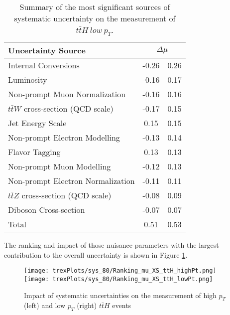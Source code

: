\begin{table}[H]
    \centering
    \begin{tabular}{l|cc}
        \hline\hline
        Uncertainty Source & \multicolumn{2}{c}{$\Delta \mu$ }  \\
        \hline
        Internal Conversions & -0.26 & 0.26 \\
        Luminosity & -0.16 & 0.17 \\
        Non-prompt Muon Normalization & -0.16 & 0.16 \\
        $t\bar{t}W$ cross-section (QCD scale) & -0.17 & 0.15 \\
        Jet Energy Scale & 0.15 & 0.15 \\
        Non-prompt Electron Modelling & -0.13 & 0.14 \\
        Flavor Tagging & 0.13 & 0.13 \\
        Non-prompt Muon Modelling & -0.12 & 0.13 \\
        Non-prompt Electron Normalization & -0.11 & 0.11 \\
        $t\bar{t}Z$ cross-section (QCD scale) & -0.08 & 0.09 \\
        Diboson Cross-section & -0.07 & 0.07 \\
        \hline           
        Total & 0.51 & 0.53 \\
        \hline\hline
    \end{tabular}
    \caption{Summary of the most significant sources of systematic uncertainty on the measurement of $t\bar{t}H\ low\ p_T$.}
    \label{tab:systematics_low_80}
\end{table}

The ranking and impact of those nuisance parameters with the largest contribution to the overall uncertainty is shown in Figure \ref{fig:ranking_80}.

\begin{figure}[H]
    \centering
    \texttt{[image: trexPlots/sys\_80/Ranking\_mu\_XS\_ttH\_highPt.png]}%
    \texttt{[image: trexPlots/sys\_80/Ranking\_mu\_XS\_ttH\_lowPt.png]}
    \caption{Impact of systematic uncertainties on the measurement of high $p_T$ (left) and low $p_T$ (right) $t\bar{t}H$ events}
    \label{fig:ranking_80}
\end{figure}


